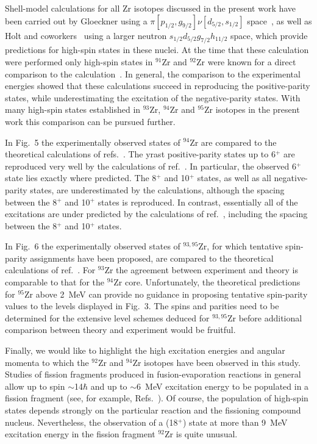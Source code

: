 Shell-model calculations for all Zr isotopes discussed in the present work have
been carried out by Gloeckner using a $\pi [ p_{1/2}, g_{9/2} ] \nu [ d_{5/2},
s_{1/2} ]$ space~\cite{Glo}, as well as Holt and coworkers~\cite{holt} 
using a larger neutron $s_{1/2}d_{5/2}g_{7/2}h_{11/2}$ space, 
which provide predictions for high-spin states in these nuclei. At the
time that these calculation were performed only high-spin states in $^{91}$Zr and
$^{92}$Zr were known for a direct comparison to the calculation~\cite{Glo,holt,Bro}.
In general, the comparison to the experimental energies showed that these
calculations succeed in reproducing the positive-parity states, while
underestimating the excitation of the negative-parity states. With many high-spin
states established in $^{93}$Zr, $^{94}$Zr and $^{95}$Zr isotopes in the present
work this comparison can be pursued further. 

In Fig.~5 the experimentally
observed states of $^{94}$Zr are compared to the theoretical calculations of refs.~\cite{Glo,holt}.
The yrast positive-parity states up to 6$^{+}$ are reproduced 
very well by the calculations of ref.~\cite{Glo}. 
In particular, the observed 6$^{+}$ state lies exactly where 
predicted. The 8$^{+}$ and 10$^{+}$ states, as well as all 
negative-parity states, are underestimated by the calculations, 
although the spacing between the 8$^+$ and 10$^+$ states is reproduced.  
In contrast, essentially all of the excitations are under predicted by the 
calculations of ref.~\cite{holt}, including the spacing between the 
8$^+$ and 10$^+$ states. 

In Fig.~6 the
experimentally observed states of $^{93,95}$Zr, for which tentative 
spin-parity assignments have been proposed, are compared to the 
theoretical calculations of ref.~\cite{holt}.
For $^{93}$Zr the agreement between experiment and theory is 
comparable to that for the $^{94}$Zr core.  
Unfortunately, the theoretical predictions for $^{95}$Zr above 2~MeV 
can provide no guidance in proposing tentative spin-parity values 
to the levels displayed in Fig.~3.
The spins and parities need to be determined for the extensive level schemes 
deduced for $^{93,95}$Zr before additional comparison between 
theory and experiment would be fruitful.

Finally, we would like to highlight the high excitation energies and 
angular momenta to
which the $^{92}$Zr and $^{94}$Zr isotopes have been observed in this study.
Studies of fission fragments produced in fusion-evaporation reactions in general
allow up to spin $\sim$14$\hbar$ and up to $\sim$6~MeV excitation energy to be 
populated in a fission fragment (see, for example,
Refs.~\cite{Por,JPG}). Of course, the population of 
high-spin states depends strongly
on the particular reaction and the fissioning compound nucleus.
Nevertheless, the observation of a  (18$^{+}$) state at
more than 9~MeV excitation energy in the fission fragment $^{92}$Zr is quite unusual.

